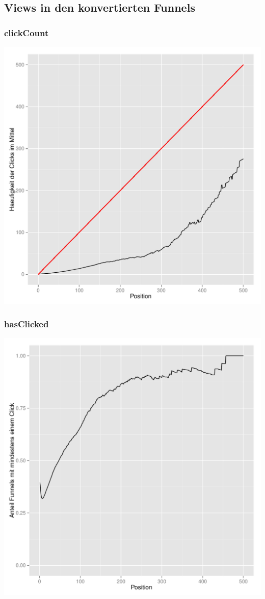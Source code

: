 \subsection{Views in den konvertierten Funnels}

\begin{frame}\frametitle{clickCount}
	    \centering\includegraphics[scale=0.39]{clickCountSucc.pdf}
\end{frame}

\begin{frame}\frametitle{hasClicked}
	    \centering\includegraphics[scale=0.39]{hasClickedSucc.pdf}
\end{frame}

